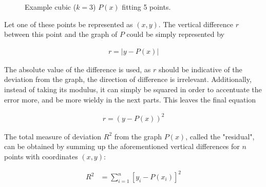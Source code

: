 \documentclass[12pt, a4paper, twoside]{article}
\begin{document}
\begin{figure}[!h]
    \centering
    \caption{
        Example cubic ($k=3$) $P(x)$ fitting 5 points.
    }
\end{figure}

Let one of these points be represented as $(x, y)$. The vertical difference $r$ between this point and
the graph of $P$ could be simply represented by

\begin{align*}
    r=|y-P(x)|
\end{align*}

The absolute value of the difference is used, as $r$ should be indicative of the
deviation from the graph, the direction of difference is irrelevant.
Additionally, instead  of taking its modulus, it can simply be squared in order
to accentuate the error more, and be more  wieldy in the next parts.  This leaves
the final equation

\begin{align*}
    r=(y-P(x))^2
\end{align*}

The total measure of deviation $R^2$ from the graph $P(x)$, called the "residual",
can be obtained by summing up the aforementioned vertical differences for $n$
points with coordinates $(x, y)$:

\begin{align*}
    R^2 & = \sum^n_{i=1}[y_i-P(x_i)]^2 \\
\end{align*}
\end{document}
